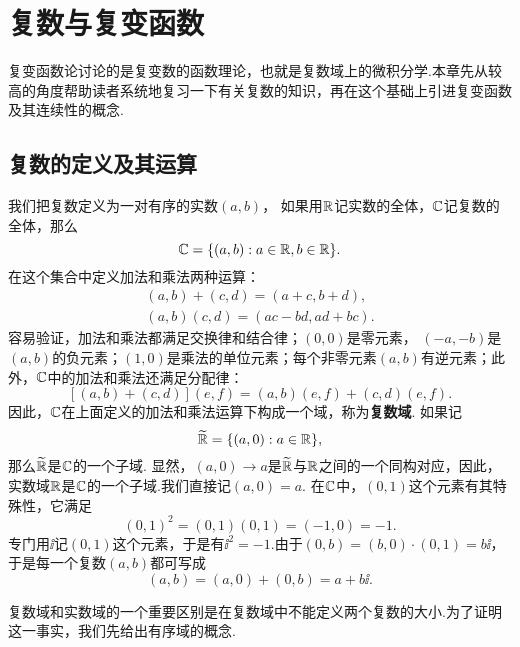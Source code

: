 \chapter{复数与复变函数\label{chap1}}
复变函数论讨论的是复变数的函数理论，也就是复数域上的微积分学.本章先从较高的角度帮助读者系统地复习一下有关复数的知识，再在这个基础上引进复变函数及其连续性的概念.

\section{复数的定义及其运算\label{sec1.1}}
我们把复数定义为一对有序的实数$(a,b)$， 如果用$\mathbb R$记实数的全体，$\mathbb C$记复数的全体，那么
\[
  \mathbb C = \{(a,b): a\in\mathbb R, b\in\mathbb R \}.
\]
在这个集合中定义加法和乘法两种运算：
\begin{gather*}
  (a,b) + (c,d) = (a + c, b + d),\\
  (a,b)(c,d) = (ac - bd, ad + bc).
\end{gather*}
容易验证，加法和乘法都满足交换律和结合律；$(0,0)$是零元素，
$(-a,-b)$是$(a,b)$的负元素；$(1,0)$是乘法的单位元素；每个非零元素$(a,b)$有逆元素；此外，$\mathbb C$中的加法和乘法还满足分配律：
\[
  [(a,b) + (c,d)](e,f) = (a,b)(e,f) + (c,d)(e,f).
\]
因此，$\mathbb C$在上面定义的加法和乘法运算下构成一个域，称为\textbf{复数域}. 如果记
\[
  \widetilde{\mathbb R} = \{(a,0): a\in\mathbb R \},
\]
那么$\widetilde{\mathbb R}$是$\mathbb C$的一个子域. 显然，$(a,0)\to a$是$\widetilde{\mathbb R}$与$\mathbb R$之间的一个同构对应，因此，实数域$\mathbb R$是$\mathbb C$的一个子域.我们直接记$(a,0)=a$. 在$\mathbb C$中，$(0,1)$这个元素有其特殊性，它满足
\[
  (0,1)^2 = (0,1)(0,1) = (-1,0) = -1.
\]
专门用$\ii$记$(0,1)$这个元素，于是有$\ii^2=-1$.由于$(0,b)=(b,0)\cdot(0,1)=b\ii$，于是每一个复数$(a,b)$都可写成
\[
  (a,b) = (a,0) + (0,b) = a + b\ii.
\]

复数域和实数域的一个重要区别是在复数域中不能定义两个复数的大小.为了证明这一事实，我们先给出有序域的概念.

